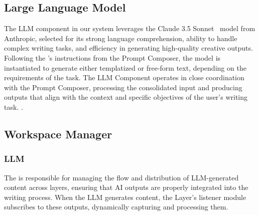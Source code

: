 \subsection{Large Language Model}
The LLM component in our system leverages the Claude 3.5 Sonnet~\cite{anthropicclaude} model from Anthropic, selected for its strong language comprehension, ability to handle complex writing tasks, and efficiency in generating high-quality creative outputs. Following the 's instructions from the Prompt Composer, the model is instantiated to generate either templatized or free-form text, depending on the requirements of the task. The LLM Component operates in close coordination with the Prompt Composer, processing the consolidated input and producing outputs that align with the context and specific objectives of the user’s writing task. .

\subsection{Workspace Manager}

\subsubsection{} 


\subsubsection{LLM } The  is responsible for managing the flow and distribution of LLM-generated content across layers, ensuring that AI outputs are properly integrated into the writing process. When the LLM generates content, the  Layer's listener module subscribes to these outputs, dynamically capturing and processing them. 



